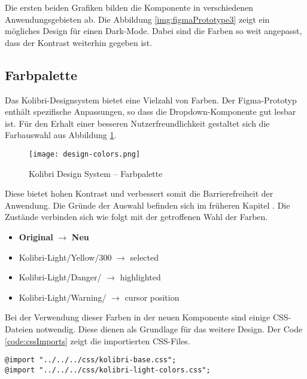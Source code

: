 Die ersten beiden Grafiken bilden die Komponente in verschiedenen Anwendungsgebieten ab. 
Die Abbildung \ref{img:figmaPrototype3} zeigt ein mögliches Design für einen Dark-Mode. 
Dabei sind die Farben so weit angepasst, dass der Kontrast weiterhin gegeben ist. 


\subsection{Farbpalette}
\label{sec:colorContrast}

Das Kolibri-Designsystem bietet eine Vielzahl von Farben. 
Der Figma-Prototyp enthält spezifische Anpassungen, so dass die Dropdown-Komponente gut lesbar ist. 
Für den Erhalt einer besseren Nutzerfreundlichkeit gestaltet sich die Farbauswahl aus Abbildung \ref{img:designColors}. 

\begin{figure}[!htb]
    \centering
    \texttt{[image: design-colors.png]}
    \caption{\centering Kolibri Design System – Farbpalette}
    \label{img:designColors}
\end{figure}

Diese bietet hohen Kontrast und verbessert somit die Barrierefreiheit der Anwendung. 
Die Gründe der Auswahl befinden sich im früheren Kapitel \textbf{}. 
Die Zustände verbinden sich wie folgt mit der getroffenen Wahl der Farben. 

\begin{itemize}
    \item \textbf{Original} $\rightarrow$ \textbf{Neu}
    \item Kolibri-Light/Yellow/300 $\rightarrow$ selected
    \item Kolibri-Light/Danger/ $\rightarrow$ highlighted
    \item Kolibri-Light/Warning/ $\rightarrow$ cursor position
\end{itemize}

Bei der Verwendung dieser Farben in der neuen Komponente sind einige CSS-Dateien notwendig. 
Diese dienen als Grundlage für das weitere Design. 
Der Code \ref{code:cssImports} zeigt die importierten CSS-Files. 

\begin{lstlisting}[style = htmlcssjs, caption = Notwendige CSS-Imports, label = code:cssImports]
@import "../../../css/kolibri-base.css";
@import "../../../css/kolibri-light-colors.css";
\end{lstlisting}

